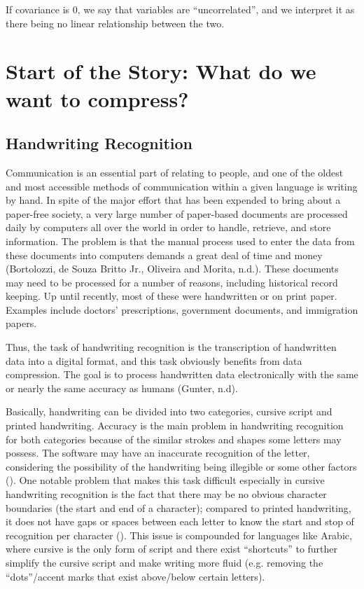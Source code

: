 \documentclass[12pt]{report}
\begin{document}
                If covariance is 0, we say that variables are ``uncorrelated'', and we interpret it as there being no linear relationship between the two.
    
    \chapter{Start of the Story: What do we want to compress?}
        \section{Handwriting Recognition}
            Communication is an essential part of relating to people, and one of the oldest and most accessible methods of communication within a given language is writing by hand. In spite of the major effort that has been expended to bring about a paper-free society, a very large number of paper-based documents are processed daily by computers all over the world in order to handle, retrieve, and store information. The problem is that the manual process used to enter the data from these documents into computers demands a great deal of time and money (Bortolozzi, de Souza Britto Jr., Oliveira and Morita, n.d.). These documents may need to be processed for a number of reasons, including historical record keeping. Up until recently, most of these were handwritten or on print paper. Examples include doctors' prescriptions, government documents, and immigration papers.
        
            Thus, the task of handwriting recognition is the transcription of handwritten data into a digital format, and this task obviously benefits from data compression. The goal is to process handwritten data electronically with the same or nearly the same accuracy as humans (Gunter, n.d).
            
            Basically, handwriting can be divided into two categories, cursive script and printed handwriting. Accuracy is the main problem in handwriting recognition for both categories because of the similar strokes and shapes some letters may possess. The software may have an inaccurate recognition of the letter, considering the possibility of the handwriting being illegible or some other factors (). One notable problem that makes this task difficult especially in cursive handwriting recognition is the fact that there may be no obvious character boundaries (the start and end of a character); compared to printed handwriting, it does not have gaps or spaces between each letter to know the start and stop of recognition per character (). This issue is compounded for languages like Arabic, where cursive is the only form of script and there exist ``shortcuts'' to further simplify the cursive script and make writing more fluid (e.g. removing the ``dots''/accent marks that exist above/below certain letters).
            
\end{document}
